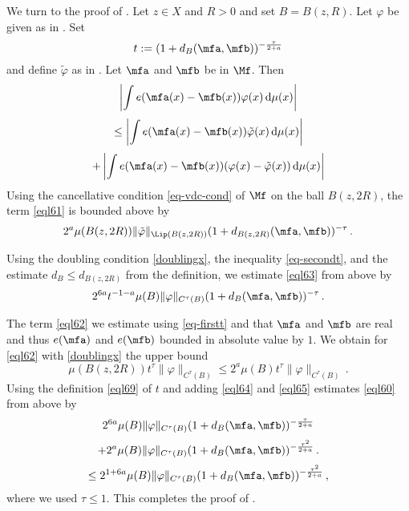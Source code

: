 We turn to the proof of .
Let $z\in X$ and $R>0$ and set $B=B(z,R)$. Let $\varphi$
be given as in .
Set
\begin{equation}\label{eql69}
    t:=(1+d_B(\mfa,\mfb))^{-\frac{\tau}{2+a}}
\end{equation}
and define $\tilde{\varphi}$ as in . Let $\mfa$ and $\mfb$ be in $\Mf$.
Then
   \begin{equation}\label{eql60}
       \left|\int e(\mfa(x)-{\mfb(x)}) \varphi (x)\, \mathrm{d}\mu(x)\right|
   \end{equation}
      \begin{equation}\label{eql61}
   \le \left|\int e(\mfa(x)-{\mfb(x)}) \tilde{\varphi} (x)\, \mathrm{d}\mu(x)\right|
   \end{equation}
           \begin{equation}\label{eql62}
     + \left|\int e(\mfa(x)-{\mfb(x)}) (\varphi (x)-\tilde{\varphi}(x))\, \mathrm{d}\mu(x)\right|
   \end{equation}
Using the cancellative condition \eqref{eq-vdc-cond} of $\Mf$ on the ball $B(z,2R)$, the term \eqref{eql61} is bounded above by
 \begin{equation}\label{eql63}
       2^a \mu(B(z,2R)) \|\tilde{\varphi}\|_{\Lip(B(z,2R))} (1 + d_{B(z,2R)}(\mfa,\mfb))^{-\tau} \, .
 \end{equation}



Using the doubling condition \eqref{doublingx},
the inequality \eqref{eq-secondt}, and the estimate
$d_B\le d_{B(z,2R)}$ from the definition,
we estimate \eqref{eql63} from above by
\begin{equation}\label{eql64}
       2^{6a}t^{-1-a} \mu(B) \|{\varphi}\|_{C^\tau(B)}
       (1 + d_{B}(\mfa,\mfb))^{-\tau} \, .
 \end{equation}

The term \eqref{eql62} we estimate using
\eqref{eq-firstt} and that
$\mfa$ and $\mfb$ are real and thus $e(\mfa)$ and
$e(\mfb)$ bounded in absolute value by $1$.
We obtain for \eqref{eql62} with \eqref{doublingx}
the upper bound
  \begin{equation}\label{eql65}
      \mu(B(z,2R)) t^{\tau} \|\varphi\|_{C^\tau(B)}
      \le 2^a \mu(B) t^{\tau} \|\varphi\|_{C^\tau(B)}
      \,.
 \end{equation}
Using the definition \eqref{eql69} of $t$ and adding
\eqref{eql64} and \eqref{eql65} estimates
\eqref{eql60} from above by
\begin{equation}
       2^{6a} \mu(B) \|{\varphi}\|_{C^\tau(B)}
       (1 + d_{B}(\mfa,\mfb))^{-\frac{\tau}{2+a}}
       \end{equation}
\begin{equation} +
        2^a \mu(B) \|{\varphi}\|_{C^\tau(B)}
       (1 + d_{B}(\mfa,\mfb))^{-\frac{\tau^2}{2+a}}\, .
 \end{equation}
\begin{equation}\label{eql66}
      \le 2^{1+6a} \mu(B) \|{\varphi}\|_{C^\tau(B)}
       (1 + d_{B}(\mfa,\mfb))^{-\frac{\tau^2}{2+a}} \, ,
 \end{equation}
where we used $\tau\le 1$.
This completes the proof of .


